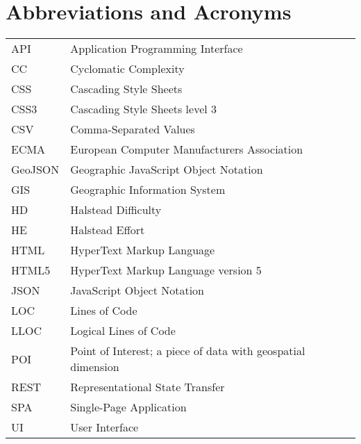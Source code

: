 
\chapter*{Abbreviations and Acronyms}


\noindent
\begin{longtable}{@{}p{}p{}@{}}
API & Application Programming Interface \\
CC & Cyclomatic Complexity \\
CSS & Cascading Style Sheets \\
CSS3 & Cascading Style Sheets level 3 \\
CSV & Comma-Separated Values \\
ECMA & European Computer Manufacturers Association \\
GeoJSON & Geographic JavaScript Object Notation \\
GIS & Geographic Information System \\
HD & Halstead Difficulty \\
HE & Halstead Effort \\
HTML & HyperText Markup Language \\
HTML5 & HyperText Markup Language version 5 \\
JSON & JavaScript Object Notation \\
LOC & Lines of Code \\
LLOC & Logical Lines of Code \\
POI & Point of Interest; a piece of data with geospatial dimension \\
REST & Representational State Transfer \\
SPA & Single-Page Application \\
UI & User Interface \\

\end{longtable}
